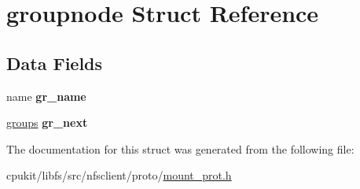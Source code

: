 \hypertarget{structgroupnode}{}\section{groupnode Struct Reference}
\label{structgroupnode}
\subsection*{Data Fields}
\begin{DoxyCompactItemize}
\item 
\mbox{\label{structgroupnode_a32e2f31f9ec7aa26ed358e7244b8781d}} 
name {\bfseries gr\+\_\+name}
\item 
\mbox{\label{structgroupnode_a8a10f58153f1ef99c14ebd82109a2019}} 
\mbox{\hyperlink{structgroupnode}{groups}} {\bfseries gr\+\_\+next}
\end{DoxyCompactItemize}


The documentation for this struct was generated from the following file\+:\begin{DoxyCompactItemize}
\item 
cpukit/libfs/src/nfsclient/proto/\mbox{\hyperlink{mount__prot_8h}{mount\+\_\+prot.\+h}}\end{DoxyCompactItemize}
